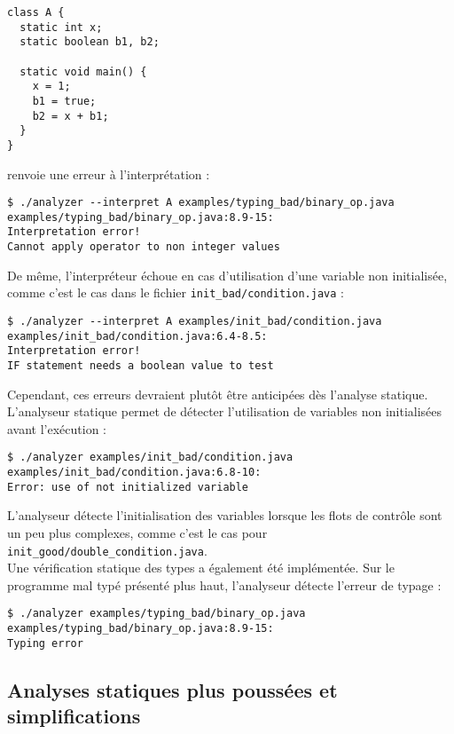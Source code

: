 \documentclass[paper=a4, fontsize=11pt]{scrartcl}
\numberwithin{figure}{section}			%
\numberwithin{table}{section}				%
\begin{document}
\begin{verbatim}
class A {
  static int x;
  static boolean b1, b2;

  static void main() {
    x = 1;
    b1 = true;
    b2 = x + b1;
  }
}
\end{verbatim}

renvoie une erreur à l'interprétation :

\begin{verbatim}
$ ./analyzer --interpret A examples/typing_bad/binary_op.java
examples/typing_bad/binary_op.java:8.9-15:
Interpretation error!
Cannot apply operator to non integer values
\end{verbatim}

De même, l'interpréteur échoue en cas d'utilisation d'une variable non initialisée, comme c'est le cas dans le fichier \texttt{init\_bad/condition.java} :

\begin{verbatim}
$ ./analyzer --interpret A examples/init_bad/condition.java
examples/init_bad/condition.java:6.4-8.5:
Interpretation error!
IF statement needs a boolean value to test
\end{verbatim}

Cependant, ces erreurs devraient plutôt être anticipées dès l'analyse statique. L'analyseur statique permet de détecter l'utilisation de variables non initialisées avant l'exécution :

\begin{verbatim}
$ ./analyzer examples/init_bad/condition.java
examples/init_bad/condition.java:6.8-10:
Error: use of not initialized variable
\end{verbatim}

L'analyseur détecte l'initialisation des variables lorsque les flots de contrôle sont un peu plus complexes, comme c'est le cas pour \texttt{init\_good/double\_condition.java}.\\

Une vérification statique des types a également été implémentée. Sur le programme mal typé présenté plus haut, l'analyseur détecte l'erreur de typage :

\begin{verbatim}
$ ./analyzer examples/typing_bad/binary_op.java
examples/typing_bad/binary_op.java:8.9-15:
Typing error
\end{verbatim}

\subsection{Analyses statiques plus poussées et simplifications}
\end{document}
